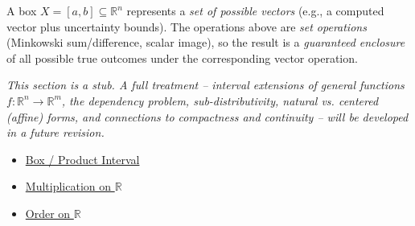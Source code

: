\begin{remark*}[Exposition]
A box $X=[a,b]\subseteq\mathbb{R}^n$ represents a \emph{set of possible vectors}
(e.g., a computed vector plus uncertainty bounds). The operations above are
\emph{set operations} (Minkowski sum/difference, scalar image), so the result is a
\emph{guaranteed enclosure} of all possible true outcomes under the corresponding
vector operation.
\end{remark*}

\begin{remark*}[Exposition]
\textit{This section is a stub. A full treatment -- interval extensions of general
functions $f:\mathbb{R}^n\to\mathbb{R}^m$, the dependency problem, sub-distributivity,
natural vs. centered (affine) forms, and connections to compactness and continuity --
will be developed in a future revision.}
\end{remark*}

\begin{dependencies}
\begin{itemize}
  \item \hyperref[def:product-interval-box]{Box / Product Interval}
  \item \hyperref[def:multiplication-on-r]{Multiplication on $\mathbb{R}$}
  \item \hyperref[def:order-on-r]{Order on $\mathbb{R}$}
\end{itemize}
\end{dependencies}
